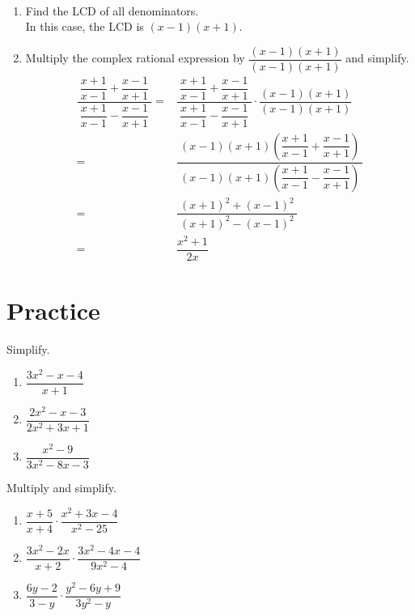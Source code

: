\documentclass[
  en,11pt]{elegantbook}
\let\BeginKnitrBlock\begin \let\EndKnitrBlock\end
\begin{document}
\BeginKnitrBlock{solution}
{}\\

\begin{enumerate}
\def\labelenumi{\arabic{enumi}.}

\item
  Find the LCD of all denominators.\\
  In this case, the LCD is \((x-1)(x+1)\).
\item
  Multiply the complex rational expression by \(\dfrac{(x-1)(x+1)}{(x-1)(x+1)}\) and simplify.
  \[
  \begin{aligned}
   \dfrac{~\dfrac{x+1}{x-1}+\dfrac{x-1}{x+1}~}{~\dfrac{x+1}{x-1}-\dfrac{x-1}{x+1}~}
   =&\dfrac{~\dfrac{x+1}{x-1}+\dfrac{x-1}{x+1}~}{~\dfrac{x+1}{x-1}-\dfrac{x-1}{x+1}~}\cdot \dfrac{(x-1)(x+1)}{(x-1)(x+1)}\\[5pt]
   =& \dfrac{~(x-1)(x+1)\left(\dfrac{x+1}{x-1}+\dfrac{x-1}{x+1}\right)~}{~(x-1)(x+1)\left(\dfrac{x+1}{x-1}-\dfrac{x-1}{x+1}\right)~}\\[5pt]
   =& \dfrac{~(x+1)^2+(x-1)^2~}{~(x+1)^2-(x-1)^2~}\\[5pt]
   =& \dfrac{x^2+1}{2x}
  \end{aligned}
  \]
\end{enumerate}
\EndKnitrBlock{solution}

\newpage

\hypertarget{practice-2}{%
\section{Practice}\label{practice-2}}

\BeginKnitrBlock{exercise}
\protect\hypertarget{exr:unnamed-chunk-55}{}{\label{exr:unnamed-chunk-55} }
Simplify.

\begin{enumerate}
\def\labelenumi{\arabic{enumi}.}
\item
  \(\dfrac{3x^2-x-4}{x+1}\)
\item
  \(\dfrac{2x^2-x-3}{2x^2+3x+1}\)
\item
  \(\dfrac{x^2-9}{3x^2-8x-3}\)
\end{enumerate}
\EndKnitrBlock{exercise}

\BeginKnitrBlock{exercise}
\protect\hypertarget{exr:unnamed-chunk-56}{}{\label{exr:unnamed-chunk-56} }
Multiply and simplify.

\begin{enumerate}
\def\labelenumi{\arabic{enumi}.}
\item
  \(\dfrac{x+5}{x+4}\cdot\dfrac{x^2+3x-4}{x^2-25}\)
\item
  \(\dfrac{3x^2-2x}{x+2}\cdot\dfrac{3x^2-4x-4}{9x^2-4}\)
\item
  \(\dfrac{6y-2}{3-y}\cdot\dfrac{y^2-6y+9}{3y^2-y}\)
\end{enumerate}
\EndKnitrBlock{exercise}
\end{document}
